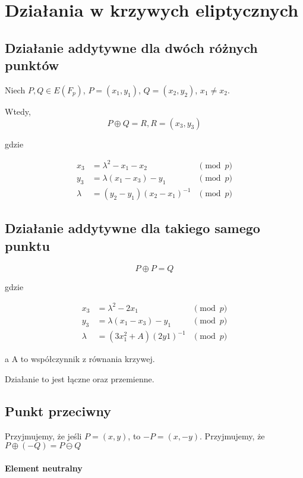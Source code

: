 \documentclass{report}
\begin{document}
\section{Działania w krzywych eliptycznych}

\subsection{Działanie addytywne dla dwóch różnych punktów}

Niech $P, Q \in E(F_p)$, $P = (x_1, y_1)$, $Q = (x_2, y_2)$, $x_1 \neq x_2$.

Wtedy,
$$
	P \oplus Q = R, R = (x_3, y_3)
$$

gdzie

\begin{align*}
	x_3     & = \lambda^2 - x_1 - x_2       & \pmod{p} \\
	y_3     & = \lambda (x_1 - x_3) - y_1   & \pmod{p} \\
	\lambda & = (y_2 - y_1)(x_2 - x_1)^{-1} & \pmod{p}
\end{align*}

\subsection{Działanie addytywne dla takiego samego punktu}

$$ P \oplus P = Q $$

gdzie

\begin{align*}
	x_3     & = \lambda^2 - 2x_1         & \pmod{p} \\
	y_3     & = \lambda(x_1 - x_3) - y_1 & \pmod{p} \\
	\lambda & = (3x_1^2 + A)(2y1)^{-1}   & \pmod{p}
\end{align*}

a A to współczynnik z równania krzywej.

Działanie to jest łączne oraz przemienne.

\subsection{Punkt przeciwny}

Przyjmujemy, że jeśli $P = (x, y)$, to $-P  = (x, -y)$. Przyjmujemy, że $P \oplus (-Q) = P \ominus Q$

\paragraph{Element neutralny}
\end{document}

